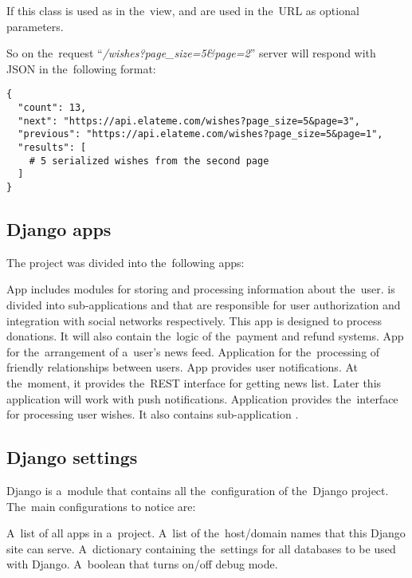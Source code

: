 If this class is used as  in the~view,  and  are used in
the~\ac{URL} as optional parameters.

So on the~request ``\textit{/wishes?page\_size=5\&page=2}'' server will respond with \ac{JSON} in the~following format:

\begin{lstlisting}
{
  "count": 13,
  "next": "https://api.elateme.com/wishes?page_size=5&page=3",
  "previous": "https://api.elateme.com/wishes?page_size=5&page=1",
  "results": [
    # 5 serialized wishes from the second page
  ]
}
\end{lstlisting}


\subsection{Django apps}
The project was divided into the~following apps:

\begin{itemize}

 App includes modules for storing and processing information about the~user.  is divided
into sub-applications  and  that are responsible for user authorization and integration
with social networks respectively.  This app is designed to process donations. It will also contain
the~logic of the~payment and refund systems.
 App for the~arrangement of a~user's news feed.
 Application for the~processing of friendly relationships between users.
 App provides user notifications. At the~moment, it provides the~\ac{REST} interface for getting
news list. Later this appli\-cation will work with push notifications.
 Application provides the~interface for processing user wishes. It also contains sub-application
.

\end{itemize}

\subsection{Django settings}
Django  is a~module that contains all the~configuration of the~Django project. The~main
configurations to notice are:

\begin{itemize}\setlength\itemsep{-0.2em}
     A~list of all apps in a~project.
     A~list of the~host/domain names that this Django site can serve.
     A~dictionary containing the~settings for all databases to be used with Django.
     A~boolean that turns on/off debug mode.
\end{itemize}

